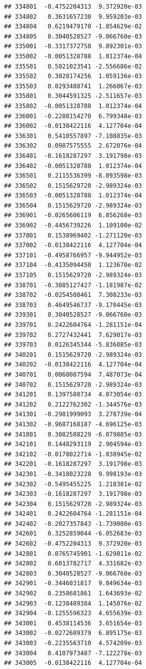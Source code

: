 \begin{frame}[fragile]
\begin{verbatim}
## 334801  -0.4752204313  9.372920e-03
## 334802   0.3631657230  9.959203e-03
## 334804   0.6219479170 -1.854629e-02
## 334805   0.3040528527 -9.066760e-03
## 335001  -0.3317372758  9.892301e-03
## 335002  -0.0051328788  1.012374e-04
## 335501   0.5821023541 -2.556686e-02
## 335502   0.3028174256  1.059136e-03
## 335503   0.0293488741  1.266067e-03
## 335801   0.3044591325 -2.511657e-03
## 335802  -0.0051328788  1.012374e-04
## 336001  -0.2280154270  6.799348e-03
## 336002  -0.0138422116  4.127704e-04
## 336301   0.5410557897 -7.108835e-03
## 336302   0.0987575555  2.672076e-04
## 336401  -0.1618287297  3.191798e-03
## 336402  -0.0051328788  1.012374e-04
## 336501   0.2115536399 -8.093598e-03
## 336502   0.1515629720 -2.989324e-03
## 336503  -0.0051328788  1.012374e-04
## 336504   0.1515629720 -2.989324e-03
## 336901  -0.0265606119  6.856268e-03
## 336902  -0.4456739226  1.109100e-02
## 337001   0.1538969402 -1.271120e-03
## 337002  -0.0138422116  4.127704e-04
## 337101  -0.4958766957 -9.944952e-03
## 337104  -0.4135094450  1.123670e-02
## 337105   0.1515629720 -2.989324e-03
## 338701  -0.3885127427 -1.181987e-02
## 338702  -0.0254508461  7.308233e-03
## 338703   0.4649546737 -9.170445e-03
## 339301   0.3040528527 -9.066760e-03
## 339701   0.2422604764 -1.281151e-04
## 339702   0.2727432441  7.629017e-03
## 339703   0.0126345344 -5.836085e-03
## 340201   0.1515629720 -2.989324e-03
## 340202  -0.0138422116  4.127704e-04
## 340701   0.0060087594  7.487073e-04
## 340702   0.1515629720 -2.989324e-03
## 341201   0.1397580734  4.073054e-03
## 341202   0.2122762302 -1.344576e-03
## 341301  -0.2981999093  3.278739e-04
## 341302  -0.9687168187 -4.696125e-03
## 341801   0.3082588229 -6.079885e-03
## 342101   0.1448293119  2.904594e-03
## 342102  -0.0178022714 -1.038945e-02
## 342201  -0.1618287297  3.191798e-03
## 342301  -0.3418023228  9.998193e-03
## 342302  -0.5495455225  1.218381e-02
## 342303  -0.1618287297  3.191798e-03
## 342304   0.1515629720 -2.989324e-03
## 342401   0.2422604764 -1.281151e-04
## 342402  -0.2027357843 -1.739080e-03
## 342601   0.3252859044 -6.052683e-03
## 342602  -0.4752204313  9.372920e-03
## 342801   0.0765745901 -1.629811e-02
## 342802   0.6013782717  4.331682e-03
## 342803   0.3040528527 -9.066760e-03
## 342901  -0.3446031817  9.049634e-03
## 342902   0.2358681861  1.643693e-02
## 342903  -0.1238489384  1.145076e-02
## 342904  -0.1255596323  4.655639e-03
## 343001   0.4538114536  3.651654e-03
## 343002  -0.0272689379  6.895175e-03
## 343003  -0.2235563710  4.574209e-03
## 343004   0.4107973487 -7.122278e-03
## 343005  -0.0138422116  4.127704e-04

\end{verbatim}
\end{frame}
